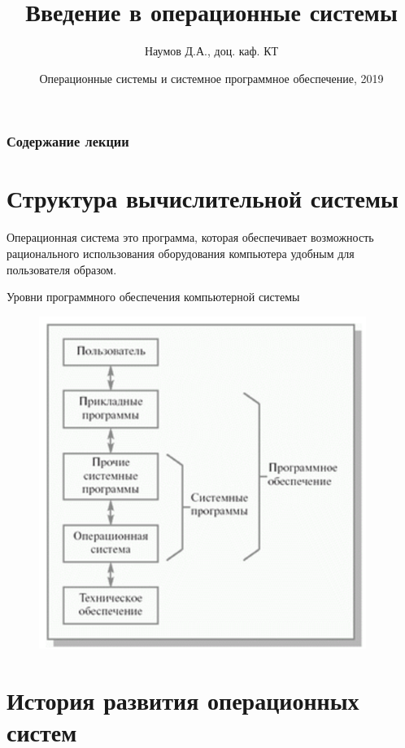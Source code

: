 \documentclass{beamer}
\title[Operating Systems]{Введение в операционные системы}
\author{Наумов Д.А., доц. каф. КТ}
\date[11.02.2019] {Операционные системы и системное программное обеспечение, 2019}
\begin{document}
\begin{frame}
  \titlepage
\end{frame}
  
\begin{frame}
  \frametitle{Содержание лекции}
  \tableofcontents  
\end{frame}

\section{Структура вычислительной системы}
  
\begin{frame}[t]
\begin{block}{Операционная система}
это программа, которая обеспечивает возможность рационального использования оборудования компьютера удобным для пользователя образом. 
\end{block}
Уровни программного обеспечения компьютерной системы
\begin{figure}[h]
\centering
\includegraphics[scale=0.5]{images/lec01-pic01.png}
\label{pic-sort}
\end{figure}
\end{frame} 
   
\section{История развития операционных систем}
   
\end{document}
